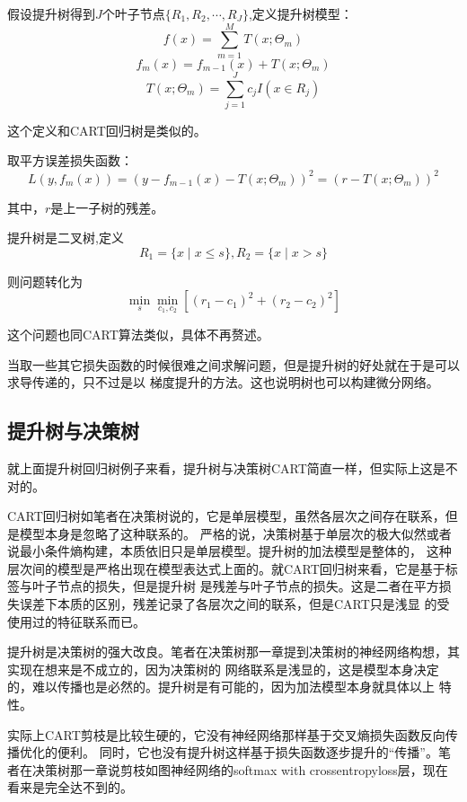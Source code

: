 \documentclass{article}
\begin{document}
        假设提升树得到$J$个叶子节点$\{R_1,R_2,\cdots,R_J\}$,定义提升树模型：
        \[f(x)=\sum_{m=1}^{M}T(x;\varTheta_m)\]
        \[f_m(x)=f_{m-1}(x)+T(x;\varTheta_m)\]
        \[T(x;\varTheta_m)=\sum_{j=1}^{J}c_jI(x\in R_j)\]

        这个定义和CART回归树是类似的。
        
        取平方误差损失函数：
        \[L(y,f_m(x))=(y-f_{m-1}(x)-T(x;\varTheta_m))^2=(r-T(x;\varTheta_m))^2\]

        其中，$r$是上一子树的残差。

        提升树是二叉树,定义
        \[R_1=\{x\mid  x\le s\},R_2=\{x\mid x >s\}\]

        则问题转化为
        \[\min_{s}\min_{c_1,c_2}[(r_1-c_1)^2+(r_2-c_2)^2]\]

        这个问题也同CART算法类似，具体不再赘述。

        当取一些其它损失函数的时候很难之间求解问题，但是提升树的好处就在于是可以求导传递的，只不过是以
        梯度提升的方法。这也说明树也可以构建微分网络。

        \subsection{提升树与决策树}
        就上面提升树回归树例子来看，提升树与决策树CART简直一样，但实际上这是不对的。

        CART回归树如笔者在决策树说的，它是单层模型，虽然各层次之间存在联系，但是模型本身是忽略了这种联系的。
        严格的说，决策树基于单层次的极大似然或者说最小条件熵构建，本质依旧只是单层模型。提升树的加法模型是整体的，
        这种层次间的模型是严格出现在模型表达式上面的。就CART回归树来看，它是基于标签与叶子节点的损失，但是提升树
        是残差与叶子节点的损失。这是二者在平方损失误差下本质的区别，残差记录了各层次之间的联系，但是CART只是浅显
        的受使用过的特征联系而已。

        提升树是决策树的强大改良。笔者在决策树那一章提到决策树的神经网络构想，其实现在想来是不成立的，因为决策树的
        网络联系是浅显的，这是模型本身决定的，难以传播也是必然的。提升树是有可能的，因为加法模型本身就具体以上
        特性。

        实际上CART剪枝是比较生硬的，它没有神经网络那样基于交叉熵损失函数反向传播优化的便利。
        同时，它也没有提升树这样基于损失函数逐步提升的“传播”。笔者在决策树那一章说剪枝如图神经网络的softmax with 
        crossentropyloss层，现在看来是完全达不到的。
\end{document}
